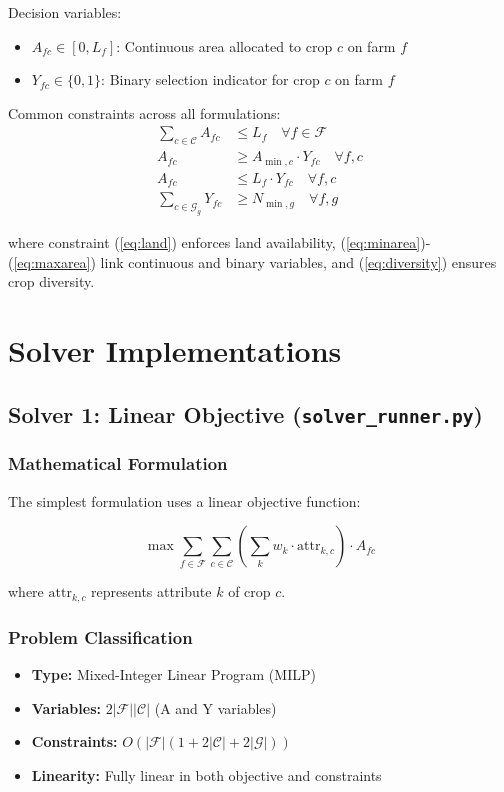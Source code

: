 \documentclass[11pt,a4paper]{article}
\begin{document}
Decision variables:
\begin{itemize}
    \item $A_{fc} \in [0, L_f]$: Continuous area allocated to crop $c$ on farm $f$
    \item $Y_{fc} \in \{0,1\}$: Binary selection indicator for crop $c$ on farm $f$
\end{itemize}

Common constraints across all formulations:
\begin{align}
\sum_{c \in \mathcal{C}} A_{fc} &\leq L_f \quad \forall f \in \mathcal{F} \label{eq:land}\\
A_{fc} &\geq A_{\min,c} \cdot Y_{fc} \quad \forall f,c \label{eq:minarea}\\
A_{fc} &\leq L_f \cdot Y_{fc} \quad \forall f,c \label{eq:maxarea}\\
\sum_{c \in \mathcal{G}_g} Y_{fc} &\geq N_{\min,g} \quad \forall f,g \label{eq:diversity}
\end{align}

where constraint (\ref{eq:land}) enforces land availability, (\ref{eq:minarea})-(\ref{eq:maxarea}) link continuous and binary variables, and (\ref{eq:diversity}) ensures crop diversity.

\section{Solver Implementations}

\subsection{Solver 1: Linear Objective (\texttt{solver\_runner.py})}

\subsubsection{Mathematical Formulation}

The simplest formulation uses a linear objective function:

\begin{equation}
\max \sum_{f \in \mathcal{F}} \sum_{c \in \mathcal{C}} \left(\sum_{k} w_k \cdot \text{attr}_{k,c}\right) \cdot A_{fc}
\label{eq:linear_obj}
\end{equation}

where $\text{attr}_{k,c}$ represents attribute $k$ of crop $c$.

\subsubsection{Problem Classification}
\begin{itemize}
    \item \textbf{Type:} Mixed-Integer Linear Program (MILP)
    \item \textbf{Variables:} $2|\mathcal{F}||\mathcal{C}|$ (A and Y variables)
    \item \textbf{Constraints:} $O(|\mathcal{F}|(1 + 2|\mathcal{C}| + 2|\mathcal{G}|))$
    \item \textbf{Linearity:} Fully linear in both objective and constraints
\end{itemize}
\end{document}
